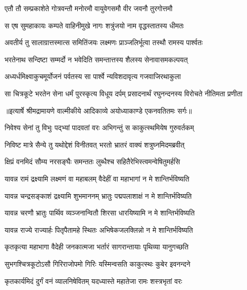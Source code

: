 \twolineshloka
{एतौ तौ सम्प्रकाशेते गोत्रवन्तौ मनोरमौ}
{वायुवेगसमौ वीर जवनौ तुरगोत्तमौ} %

\twolineshloka
{स एष सुमहाकायः कम्पते वाहिनीमुखे}
{नागः शत्रुंजयो नाम वृद्धस्तातस्य धीमतः} %

\twolineshloka
{अवतीर्य तु सालाग्रात्तस्मात्स समितिंजयः}
{लक्ष्मणः प्राञ्जलिर्भूत्वा तस्थौ रामस्य पार्श्वतः} %

\twolineshloka
{भरतेनाथ सन्दिष्टा सम्मर्दो न भवेदिति}
{समन्तात्तस्य शैलस्य सेनावासमकल्पयत्} %

\twolineshloka
{अध्यर्धमिक्ष्वाकुचमूर्योजनं पर्वतस्य सा}
{पार्श्वे न्यविशदावृत्य गजवाजिरथाकुला} %

\fourlineindentedshloka
{सा चित्रकूटे भरतेन सेना}
{धर्मं पुरस्कृत्य विधूय दर्पम्}
{प्रसादनार्थं रघुनन्दनस्य}
{विरोचते नीतिमता प्रणीता} %


{॥इत्यार्षे श्रीमद्रामायणे वाल्मीकीये आदिकाव्ये अयोध्याकाण्डे एकनवतितमः सर्गः॥}


\twolineshloka
{निवेश्य सेनां तु विभुः पद्भ्यां पादवतां वरः}
{अभिगन्तुं स काकुत्स्थमियेष गुरुवर्तकम्} %

\twolineshloka
{निविष्ट मात्रे सैन्ये तु यथोद्देशं विनीतवत्}
{भरतो भ्रातरं वाक्यं शत्रुघ्नमिदमब्रवीत्} %

\twolineshloka
{क्षिप्रं वनमिदं सौम्य नरसङ्घैः समन्ततः}
{लुब्धैश्च सहितैरेभिस्त्वमन्वेषितुमर्हसि} %

\twolineshloka
{यावन्न रामं द्रक्ष्यामि लक्ष्मणं वा महाबलम्}
{वैदेहीं वा महाभागां न मे शान्तिर्भविष्यति} %

\twolineshloka
{यावन्न चन्द्रसङ्काशं द्रक्ष्यामि शुभमाननम्}
{भ्रातुः पद्मपलाशाक्षं न मे शान्तिर्भविष्यति} %

\twolineshloka
{यावन्न चरणौ भ्रातुः पार्थिव व्यञ्जनान्वितौ}
{शिरसा धारयिष्यामि न मे शान्तिर्भविष्यति} %

\twolineshloka
{यावन्न राज्ये राज्यार्हः पितृपैतामहे स्थितः}
{अभिषेकजलक्लिन्नो न मे शान्तिर्भविष्यति} %

\twolineshloka
{कृतकृत्या महाभागा वैदेही जनकात्मजा}
{भर्तारं सागरान्तायाः पृथिव्या यानुगच्छति} %

\twolineshloka
{सुभगश्चित्रकूटोऽसौ गिरिराजोपमो गिरिः}
{यस्मिन्वसति काकुत्स्थः कुबेर इवनन्दने} %

\twolineshloka
{कृतकार्यमिदं दुर्गं वनं व्यालनिषेवितम्}
{यदध्यास्ते महातेजा रामः शस्त्रभृतां वरः} %

